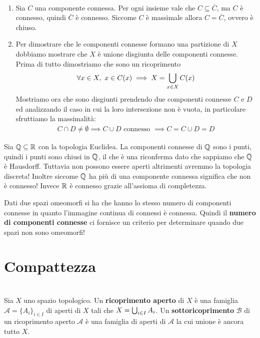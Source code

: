 \begin{demonstration}
	~{}
	\begin{enumerate}[label=\Roman*]
		\item Sia $C$ una componente connessa. Per ogni insieme vale che $C\subseteq\overline{C}$, ma $C$ è connesso, quindi $\overline{C}$ è connesso. Siccome $C$ è massimale allora $C=\overline{C}$, ovvero è chiuso.
		\item Per dimostrare che le componenti connesse formano una partizione di $X$ dobbiamo mostrare che $X$ è unione disgiunta delle componenti connesse. Prima di tutto dimostriamo che sono un ricoprimento
			\begin{equation*}
				\forall x\in X,\ x\in C(x) \implies X=\union_{x\in X}C(x)
			\end{equation*}
		Mostriamo ora che sono disgiunti prendendo due componenti connesse $C$ e $D$ ed analizzando il caso in cui la loro intersezione non è vuota, in particolare sfruttiamo la massimalità:
		\begin{gather*}
			C\cap D\neq\emptyset \implies C\cup D \text{ connesso } \implies C=C\cup D=D
		\end{gather*}
	\end{enumerate}
\vspace{-6mm}
\end{demonstration}
\begin{example}
	Sia $\mathbb{Q}\subseteq\mathbb{R}$ con la topologia Euclidea. La componenti connesse di $\mathbb{Q}$ sono i punti, quindi i punti sono chiusi in $\mathbb{Q}$, il che è una riconferma dato che sappiamo che $\mathbb{Q}$ è Hausdorff. Tuttavia non possono essere aperti altrimenti avremmo la topologia discreta!\newline
	Inoltre siccome $\mathbb{Q}$ ha più di una componente connessa significa che non è connesso! Invece $\mathbb{R}$ è connesso grazie all'assioma di completezza.
\end{example}
\begin{observe}
	Dati due spazi omeomorfi si ha che hanno lo stesso numero di componenti connesse in quanto l'immagine continua di connessi è connessa. Quindi il \textbf{numero di componenti connesse} ci fornisce un criterio per determinare quando due spazi non sono omeomorfi!
\end{observe}


		\section{Compattezza}
\begin{define}~{}\\
	Sia $X$ uno spazio topologico. Un \textbf{ricoprimento aperto} di $X$ è una famiglia $\mathcal{A}=\{A_i \}_{i\in I}$ di aperti di $X$ tali che $X=\mathop{{\bigcup}}\displaylimits_{i\in I} A_i$. \newline
	Un \textbf{sottoricoprimento} $\mathcal{B}$ di un ricoprimento aperto $\mathcal{A}$ è una famiglia di aperti di $\mathcal{A}$ la cui unione è ancora tutto $X$.
\end{define}		

